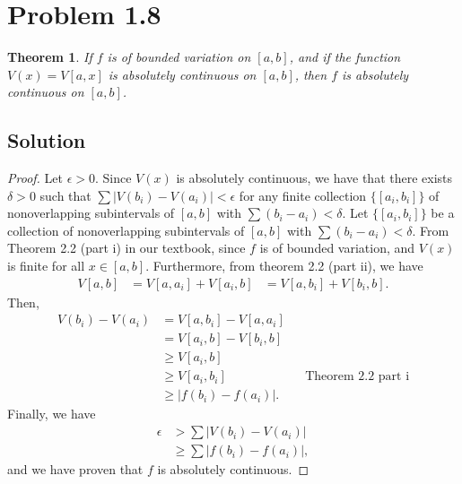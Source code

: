 \documentclass[10pt,a4paper]{article}
\theoremstyle{theorem}
\newtheorem{theorem}{Theorem}
\theoremstyle{definition}
\begin{document}
\section*{Problem 1.8}
\begin{theorem}
If $f$ is of bounded variation on $[a, b]$, and if the function $V(x) = V[a, x]$ is absolutely continuous on $[a, b]$, then $f$ is absolutely continuous on $[a, b]$.
\end{theorem}

\subsection*{Solution}
\begin{proof}
Let $\epsilon > 0$. Since $V(x)$ is absolutely continuous, we have that there exists $\delta > 0$ such that $\sum |V(b_i) - V(a_i)| < \epsilon$ for any finite collection $\{[a_i, b_i]\}$ of nonoverlapping subintervals of $[a, b]$ with $\sum (b_i - a_i) < \delta$. Let $\{[a_i, b_i]\}$ be a collection of nonoverlapping subintervals of $[a, b]$ with $\sum (b_i - a_i) < \delta$. From Theorem 2.2 (part i) in our textbook, since $f$ is of bounded variation, and $V(x)$ is finite for all $x \in [a, b]$. Furthermore, from theorem 2.2 (part ii), we have
\begin{align*}
V[a, b] &= V[a, a_i] + V[a_i, b]
&= V[a, b_i] + V[b_i, b].
\end{align*}
Then, 
\begin{align*}
V(b_i) - V(a_i) &= V[a, b_i] - V[a, a_i] \\
&= V[a_i, b] - V[b_i, b]\\
&\geq V[a_i, b]\\
&\geq V[a_i, b_i] &&\text{Theorem 2.2 part i}\\
&\geq |f(b_i) - f(a_i)|.
\end{align*}
Finally, we have
\begin{align*}
\epsilon &> \sum |V(b_i) - V(a_i)|\\
&\geq \sum |f(b_i) - f(a_i)|,
\end{align*}
and we have proven that $f$ is absolutely continuous.
\end{proof}
\end{document}
